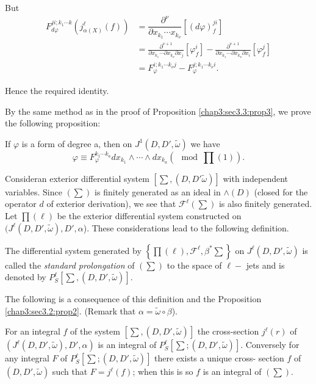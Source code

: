 But 
\begin{align*}
  F^{ji; k_1 \cdots k}_{d \varphi} \left(j^\ell_{\alpha (X)} (f )\right) & =
  \dfrac{\partial^\nu}{\partial x_{k_1} \cdots x_{k_\nu}} \left[(d
    \varphi)^{ji}_f\right]\\
  & = \frac{\partial^{\nu + 1}}{\partial x_{k_1} \cdots \partial
    x_{k_\nu} \partial x_j} \left[\varphi^i_f \right] - \frac{\partial^{\nu
      +1}}{\partial x_{k_1} \cdots \partial x_{k_\nu} \partial x_i}
  \left[\varphi^j_f\right] \\ 
  & = F^{i;k_1 \cdots k_{\nu}j}_{\varphi} -F^{j;k_1 \cdots k_{\nu}i}_{\varphi}.
\end{align*}

\noindent
Hence the required identity.

By the same method as in the proof of Proposition \ref{chap3:sec3.3:prop3}, we prove the
following proposition: 
\begin{proposition}\label{chap3:sec3.3:prop5} %
  If $\varphi$ is a form of degree a, then on $J^1 (D, D',
  \tilde{\omega})$ we have 
  $$
  \varphi \equiv F^{k_1 \cdots k_a}_{\varphi} dx_{k_1} \wedge \cdots
  \wedge dx_{k_a} \left(\mod \prod (1)\right). 
  $$
\end{proposition}

Consider\pageoriginale an exterior differential system $[\sum , (D,
  D'\tilde{\omega})]$ with independent variables. Since $(\sum)$ is
finitely generated as an ideal in $\wedge (D)$ (closed for the
operator $d$ of exterior derivation), we see that $\mathscr{F}^\ell
(\sum)$ is also finitely generated. Let $\prod (\ell)$ be the exterior
differential system constructed on $(J^\ell (D, D' , \tilde{\omega}),
D' , \alpha$). These considerations lead to the following
definition. 

\begin{defi*}%
  The differential system generated by $\left\{\prod (\ell) , \mathscr{F}^\ell,
  \beta^* \sum\right\}$ on $J^\ell (D, D', \tilde{\omega})$ is called the
       {\em standard prolongation} of $(\sum)$ to the space of $\ell
       -$ jets and is denoted by $P^\ell_S [ \sum ,(D, D' ,
         \tilde{\omega})]$. 
\end{defi*}

The following is a consequence of this definition and the Proposition
\ref{chap3:sec3.2:prop2}. (Remark that $\alpha = \tilde{\omega} \circ \beta$). 

\begin{proposition}\label{chap3:sec3.3:prop6} %
  For an integral $f$ of the system $[\sum, (D, D' , \tilde{\omega})]$
  the cross-section $j^\ell(r)$ of $(J^\ell (D, D' , \tilde{\omega}),
  D', \alpha)$ is an integral of $P^\ell_S [\sum; (D, D' ,
    \tilde{\omega})]$. Conversely for any integral $F$ of $P^\ell_S
  [\sum ; (D, D' , \tilde{\omega})]$ there exists a unique cross-
  section  $f$ of $(D, D' , \tilde{\omega})$ such that $F =
  j^\ell(f)$; when this is so $f$ is an integral of $(\sum)$. 
\end{proposition}

